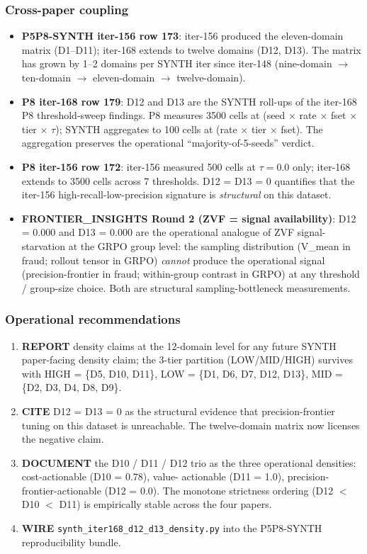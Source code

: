 \documentclass{article}
\begin{document}
\subsubsection{Cross-paper coupling}
\begin{itemize}
\item \textbf{P5P8-SYNTH iter-156 row 173}: iter-156 produced the
eleven-domain matrix (D1--D11); iter-168 extends to twelve domains
(D12, D13). The matrix has grown by 1--2 domains per SYNTH iter
since iter-148 (nine-domain $\to$ ten-domain $\to$ eleven-domain
$\to$ twelve-domain).
\item \textbf{P8 iter-168 row 179}: D12 and D13 are the SYNTH
roll-ups of the iter-168 P8 threshold-sweep findings. P8 measures
3500 cells at (seed $\times$ rate $\times$ fset $\times$ tier
$\times$ $\tau$); SYNTH aggregates to 100 cells at (rate $\times$
tier $\times$ fset). The aggregation preserves the operational
``majority-of-5-seeds'' verdict.
\item \textbf{P8 iter-156 row 172}: iter-156 measured 500 cells at
$\tau = 0.0$ only; iter-168 extends to 3500 cells across 7
thresholds. D12 = D13 = 0 quantifies that the iter-156
high-recall-low-precision signature is \emph{structural} on this
dataset.
\item \textbf{FRONTIER\_INSIGHTS Round 2 (ZVF = signal
availability)}: D12 = 0.000 and D13 = 0.000 are the operational
analogue of ZVF signal-starvation at the GRPO group level: the
sampling distribution (V\_mean in fraud; rollout tensor in GRPO)
\emph{cannot} produce the operational signal (precision-frontier
in fraud; within-group contrast in GRPO) at any threshold /
group-size choice. Both are structural sampling-bottleneck
measurements.
\end{itemize}

\subsubsection{Operational recommendations}
\begin{enumerate}
\item \textbf{REPORT} density claims at the 12-domain level for
any future SYNTH paper-facing density claim; the 3-tier partition
(LOW/MID/HIGH) survives with HIGH = \{D5, D10, D11\}, LOW = \{D1,
D6, D7, D12, D13\}, MID = \{D2, D3, D4, D8, D9\}.
\item \textbf{CITE} D12 = D13 = 0 as the structural evidence that
precision-frontier tuning on this dataset is unreachable. The
twelve-domain matrix now licenses the negative claim.
\item \textbf{DOCUMENT} the D10 / D11 / D12 trio as the three
operational densities: cost-actionable (D10 = 0.78), value-
actionable (D11 = 1.0), precision-frontier-actionable (D12 = 0.0).
The monotone strictness ordering (D12 $<$ D10 $<$ D11) is
empirically stable across the four papers.
\item \textbf{WIRE} \texttt{synth\_iter168\_d12\_d13\_density.py}
into the P5P8-SYNTH reproducibility bundle.
\end{enumerate}
\end{document}
